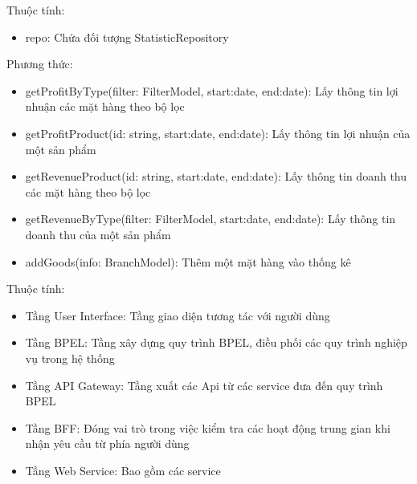 Thuộc tính:
\begin{itemize}
	\item repo: Chứa đối tượng StatisticRepository
\end{itemize}
Phương thức:
\begin{itemize}
	\item getProfitByType(filter: FilterModel, start:date,
	      end:date): Lấy thông tin lợi nhuận các mặt hàng theo bộ lọc
	\item getProfitProduct(id: string, start:date,
	      end:date): Lấy thông tin lợi nhuận của một sản phẩm
	\item getRevenueProduct(id: string, start:date,
	      end:date): Lấy thông tin doanh thu các mặt hàng theo bộ lọc
	\item getRevenueByType(filter: FilterModel, start:date,
	      end:date): Lấy thông tin doanh thu của một sản phẩm
	\item addGoods(info: BranchModel): Thêm một mặt hàng vào thống kê
\end{itemize}

Thuộc tính:
\begin{itemize}
	\item Tầng User Interface: Tầng giao diện tương tác với người dùng
	\item Tầng BPEL: Tầng xây dựng quy trình BPEL, điều phối các quy trình nghiệp vụ trong hệ thống
	\item Tầng API Gateway: Tầng xuất các Api từ các service đưa đến quy trình BPEL
	\item Tầng BFF: Đóng vai trò trong việc kiểm tra các hoạt động trung gian khi nhận yêu cầu từ phía người dùng
	\item Tầng Web Service: Bao gồm các service
\end{itemize}
\newpage



